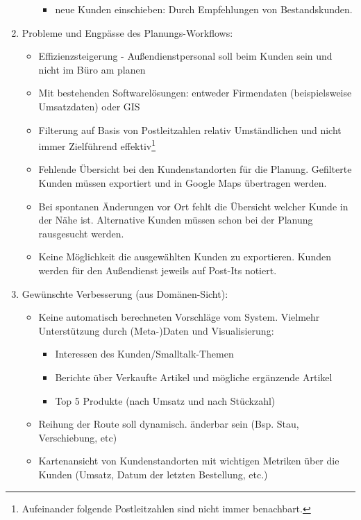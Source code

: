 \documentclass[Bachelorarbeit.tex]{subfiles}
\begin{document}
\begin{enumerate}
\begin{enumerate}
\begin{itemize}
			\item neue Kunden einschieben: Durch Empfehlungen von Bestandskunden. 
		\end{itemize}
	\end{enumerate}
	\item Probleme und Engpässe des Planungs-Workflows:
	\begin{itemize}
		\item Effizienzsteigerung - Außendienstpersonal soll beim Kunden sein und nicht im Büro am planen
		\item Mit bestehenden Softwarelösungen: entweder Firmendaten (beispielsweise Umsatzdaten) oder \ac{GIS} 
		\item Filterung auf Basis von Postleitzahlen relativ Umständlichen und nicht immer Zielführend effektiv\footnote{Aufeinander folgende Postleitzahlen sind nicht immer benachbart.}
		\item Fehlende Übersicht bei den Kundenstandorten für die Planung. Gefilterte Kunden müssen exportiert und in Google Maps übertragen werden.
		\item Bei spontanen Änderungen vor Ort fehlt die Übersicht welcher Kunde in der Nähe ist. Alternative Kunden müssen schon bei der Planung rausgesucht werden.
		\item Keine Möglichkeit die ausgewählten Kunden zu exportieren. Kunden werden für den Außendienst jeweils auf Post-Its notiert. 
	\end{itemize}
	\item Gewünschte Verbesserung (aus Domänen-Sicht):
	\begin{itemize}
		\item Keine automatisch berechneten Vorschläge vom System. Vielmehr Unterstützung durch (Meta-)Daten und Visualisierung:
		\begin{itemize}
			\item Interessen des Kunden/Smalltalk-Themen
			\item Berichte über Verkaufte Artikel und mögliche ergänzende Artikel
			\item Top 5 Produkte (nach Umsatz und nach Stückzahl)
		\end{itemize}
		\item Reihung der Route soll dynamisch. änderbar sein (Bsp. Stau, Verschiebung, etc)
		\item Kartenansicht von Kundenstandorten mit wichtigen Metriken über die Kunden (Umsatz, Datum der letzten Bestellung, etc.)
	\end{itemize}
\end{enumerate}
\newpage
\end{document}
